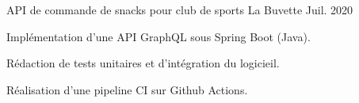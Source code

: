 

\begin{cventries}

  \cventry
    {API de commande de snacks pour club de sports} %
    {La Buvette} %
    {} %
    {Juil. 2020} %
    {
      \begin{cvitems} %
        \item {Implémentation d'une API GraphQL sous Spring Boot (Java).}
        \item {Rédaction de tests unitaires et d'intégration du logicieil.}
        \item {Réalisation d'une pipeline CI sur Github Actions.}
      \end{cvitems}
    }

\end{cventries}
